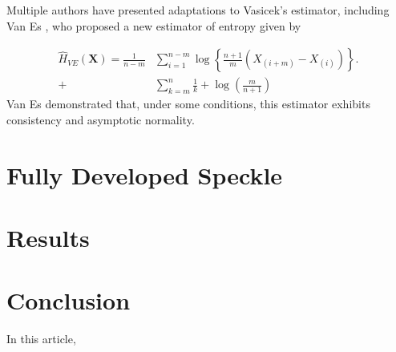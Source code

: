 \documentclass[conference]{IEEEtran}
\begin{document}
Multiple authors have presented  adaptations to Vasicek's estimator, including Van Es \cite{van1992}, who proposed a new estimator of entropy given by
 
\begin{align}
	\widehat{H}_{VE}(\bm{X})=\frac{1}{n-m}&\sum_{i=1}^{n-m}\log\left\{\frac{n+1}{m}\left(X_{(i+m)}-X_{(i)}\right)\right\}.\\
	+&\sum_{k=m}^n\frac{1}{k}+\log\left(\frac{m}{n+1}\right)\nonumber
\end{align}
Van Es demonstrated that, under some conditions, this estimator exhibits consistency and asymptotic normality.


\section{Fully Developed Speckle}

\section{Results}

\section{Conclusion}\label{sec_09}

In this article, 


%


\end{document}

